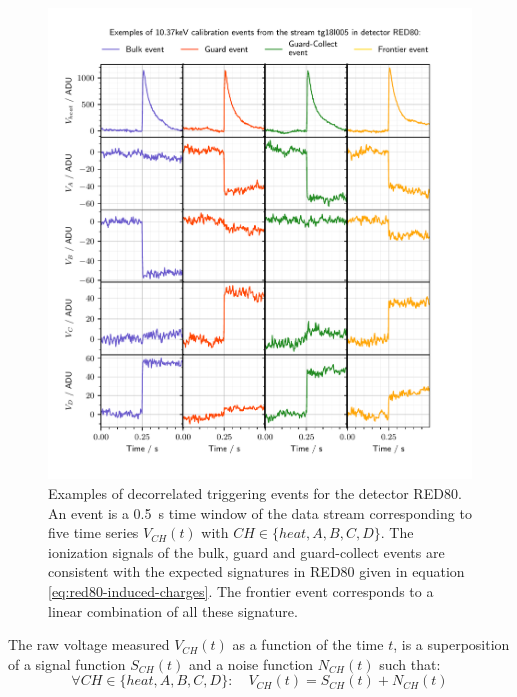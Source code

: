 \begin{figure}
\centering
\includegraphics[scale=1]{Figures/ElectrodesExperimental/pulse_raw.pdf}
\caption{Examples of decorrelated triggering events for the detector RED80. An event is a \SI{0.5}{\s} time window of the data stream corresponding to five time series $V_{CH}(t)$ with $CH \in \{heat, A,B,C,D\}$. The ionization signals of the bulk, guard and guard-collect events are consistent with the expected signatures in RED80 given in equation \ref{eq:red80-induced-charges}. The frontier event corresponds to a linear combination of all these signature.}
\label{fig:pulse-raw}
\end{figure}

The raw voltage measured $V_{CH}(t)$ as a function of the time $t$, is a superposition of a signal function $S_{CH}(t)$ and a noise function $N_{CH}(t)$ such that:
\begin{equation}
\label{eq:raw-signal-noise}
\forall CH \in \{ heat, A, B, C, D \}: \quad V_{CH}(t) = S_{CH}(t) + N_{CH}(t)
\end{equation}

